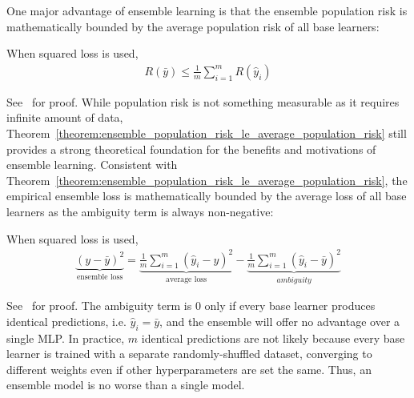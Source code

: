 One major advantage of ensemble learning is that the ensemble population risk is mathematically bounded by the average population risk of all base learners: 
\begin{theorem}\label{theorem:ensemble_population_risk_le_average_population_risk}
    When squared loss is used, 
    \begin{align*}
        R(\bar{y}) \le \frac{1}{m} \sum_{i=1}^{m} R(\hat{y}_i)
    \end{align*}
\end{theorem}
See~\cite{krogh1994neural} for proof. While population risk is not something measurable as it requires infinite amount of data, Theorem~\ref{theorem:ensemble_population_risk_le_average_population_risk} still provides a strong theoretical foundation for the benefits and motivations of ensemble learning. Consistent with Theorem~\ref{theorem:ensemble_population_risk_le_average_population_risk}, the empirical ensemble loss is mathematically bounded by the average loss of all base learners as the ambiguity term is always non-negative: 
\begin{theorem}\label{theorem:ambiguity_decomposition}
    When squared loss is used, 
    \begin{align*}
        \underbrace{(y - \bar{y})^2}_{\text{ensemble loss}} = \underbrace{\frac{1}{m} \sum_{i=1}^{m} (\hat{y}_i - y)^2}_{\text{average loss}} - \underbrace{\frac{1}{m} \sum_{i=1}^{m} (\hat{y}_i - \bar{y})^2}_{ambiguity}
    \end{align*}
\end{theorem}
See~\cite{krogh1994neural} for proof. The ambiguity term is $0$ only if every base learner produces identical predictions, i.e. $\hat{y}_i = \bar{y}$, and the ensemble will offer no advantage over a single MLP. In practice, $m$ identical predictions are not likely because every base learner is trained with a separate randomly-shuffled dataset, converging to different weights even if other hyperparameters are set the same. Thus, an ensemble model is no worse than a single model. 

